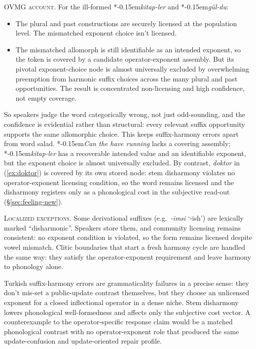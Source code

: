 \documentclass[12pt,letterpaper]{article}
\newcommand{\mention}[1]{\textit{#1}}
\newcommand{\judgesep}{\kern-0.15em}
\newcommand{\ungram}[1]{*\judgesep#1}
\begin{document}
\noindent\textsc{OVMG account.} For the ill-formed \ungram{\mention{kitap-ler}} and \ungram{\mention{gül-du}}:

\begin{itemize}
\item The plural and past constructions are securely licensed at the population
  level. The mismatched exponent choice isn't licensed.
\item The mismatched allomorph is still identifiable as an intended exponent,
  so the token is covered by a candidate operator-exponent assembly. But its
  pivotal exponent-choice node is almost universally excluded by overwhelming
  preemption from harmonic suffix choices across the many plural and past
  opportunities. The result is concentrated non-licensing and high confidence,
  not empty coverage.
\end{itemize}

So speakers judge the word categorically wrong, not just odd-sounding, and the
confidence is evidential rather than structural: every relevant suffix
opportunity supports the same allomorphic choice.
This keeps suffix-harmony errors apart from word salad. \ungram{\mention{Can the
have running}} lacks a covering assembly; \ungram{\mention{kitap-ler}} has a
recoverable intended value and an identifiable exponent, but the exponent
choice is almost universally excluded. By contrast, \mention{doktor} in
(\ref{ex:doktor}) is
covered by its own stored node: stem disharmony violates no operator-exponent
licensing condition, so the word remains licensed and the disharmony registers
only as a phonological cost in the subjective read-out
(\S\ref{sec:feeling-new}).

\noindent\textsc{Localized exceptions.} Some derivational suffixes (e.g.~\mention{-imsi} `-ish') are lexically
marked \enquote{disharmonic}. Speakers store them, and community licensing
remains consistent: no
exponent condition is violated, so the form remains licensed despite vowel
mismatch. Clitic
boundaries that start a fresh harmony cycle \autocite{KabakVogel2001} are
handled the same way: they satisfy the operator-exponent requirement and leave
harmony to phonology alone.

Turkish suffix-harmony errors are grammaticality failures in a precise sense:
they don't mis-set a public-update contrast themselves, but they choose an
unlicensed exponent for a closed inflectional operator in a dense niche. Stem
disharmony lowers phonological well-formedness and affects only the subjective
cost vector. A counterexample to the operator-specific response claim would be
a matched phonological contrast with no operator-exponent role that produced the
same update-confusion and update-oriented repair profile.
\end{document}
